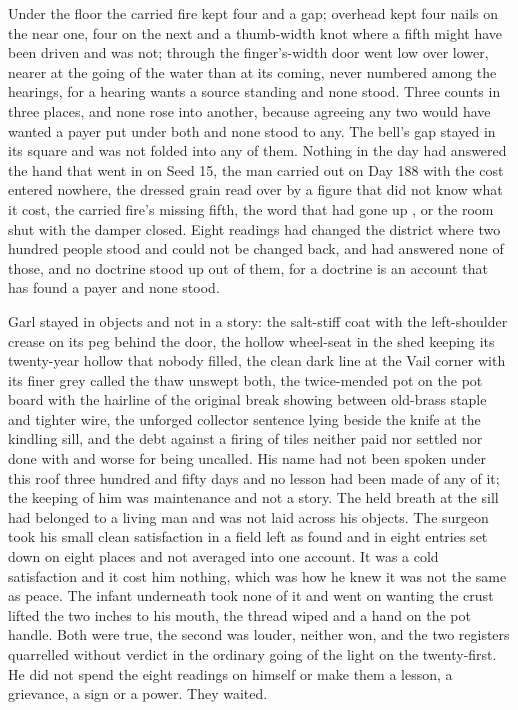 Under the floor the carried fire kept four and a gap; overhead  kept four nails on the near one, four on the next and a thumb-width knot where a fifth might have been driven and was not; through the finger’s-width door  went low over lower, nearer at the going of the water than at its coming, never numbered among the hearings, for a hearing wants a source standing and none stood. Three counts in three places, and none rose into another, because agreeing any two would have wanted a payer put under both and none stood to any. The bell’s gap stayed in its square and was not folded into any of them. Nothing in the day had answered the hand that went in on Seed 15, the man carried out on Day 188 with the cost entered nowhere, the dressed grain read over by a figure that did not know what it cost, the carried fire’s missing fifth, the word that had gone up , or the room shut with the damper closed. Eight readings had changed the district where two hundred people stood and could not be changed back, and had answered none of those, and no doctrine stood up out of them, for a doctrine is an account that has found a payer and none stood.

Garl stayed in objects and not in a story: the salt-stiff coat with the left-shoulder crease on its peg behind the door, the hollow wheel-seat in the shed keeping its twenty-year hollow that nobody filled, the clean dark line at the Vail corner with its finer grey called the thaw unswept both, the twice-mended pot on the pot board with the hairline of the original break showing between old-brass staple and tighter wire, the unforged collector sentence lying beside the knife at the kindling sill, and the debt against a firing of tiles neither paid nor settled nor done with and worse for being uncalled. His name had not been spoken under this roof three hundred and fifty days and no lesson had been made of any of it; the keeping of him was maintenance and not a story. The held breath at the sill had belonged to a living man and was not laid across his objects. The surgeon took his small clean satisfaction in a field left as found and in eight entries set down on eight places and not averaged into one account. It was a cold satisfaction and it cost him nothing, which was how he knew it was not the same as peace. The infant underneath took none of it and went on wanting the crust lifted the two inches to his mouth, the thread wiped and a hand on the pot handle. Both were true, the second was louder, neither won, and the two registers quarrelled without verdict in the ordinary going of the light on the twenty-first. He did not spend the eight readings on himself or make them a lesson, a grievance, a sign or a power. They waited.

